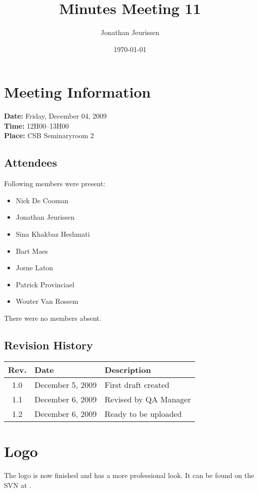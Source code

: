\documentclass[a4paper, 12pt]{article}
\begin{document}
\title{Minutes Meeting 11}
\author{Jonathan Jeurissen}
\date{\today}

\maketitle	
	\section{Meeting Information}
		\textbf{Date:} Friday, December 04, 2009\\
		\textbf{Time:} 12H00--13H00\\
		\textbf{Place:} CSB Seminaryroom 2\\
		\subsection{Attendees}
Following members were present:
			\begin{itemize}
				\item Nick De Cooman
				\item Jonathan Jeurissen
				\item Sina Khakbaz Heshmati
				\item Bart Maes
				\item Jorne Laton
				\item Patrick Provinciael
				\item Wouter Van Rossem
			\end{itemize}
There were no members absent.
			
		\subsection{Revision History}
			\begin{tabular}{c | l | l }
				\textbf{Rev.} & \textbf{Date} & \textbf{Description} \\
				\hline
				1.0 & December 5, 2009 & First draft created \\
				1.1 & December 6, 2009 & Revised by QA Manager \\
				1.2 & December 6, 2009 & Ready to be uploaded \\

			\end{tabular}		

	\section{Logo}
The logo is now finished and has a more professional look. It can be found on the SVN at \cite{site1}.
\end{document}
